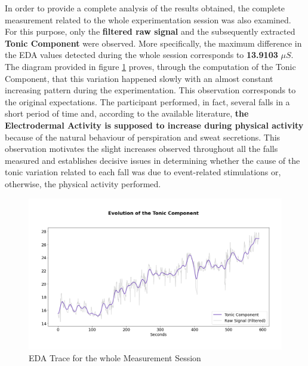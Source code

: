 In order to provide a complete analysis of the results obtained, the complete measurement related to the whole experimentation session was also examined. For this purpose, only the \textbf{filtered raw signal} and the subsequently extracted \textbf{Tonic Component} were observed. More specifically, the maximum difference in the EDA values detected during the whole session corresponds to \textbf{13.9103} $\mu S$. The diagram provided in figure \ref{fig:movisens-global} proves, through the computation of the Tonic Component, that this variation happened slowly with an almost constant increasing pattern during the experimentation. This observation corresponds to the original expectations. The participant performed, in fact, several falls in a short period of time and, according to the available literature, \textbf{the Electrodermal Activity is supposed to increase during physical activity} \cite{eda-interval-4} because of the natural behaviour of perspiration and sweat secretions. This observation motivates the slight increases observed throughout all the falls measured and establishes decisive issues in determining whether the cause of the tonic variation related to each fall was due to event-related stimulations or, otherwise, the physical activity performed.


\begin{figure}[h]
    \centering
    \includegraphics[width=\textwidth]{./images/movisens/Global.png}
    \caption{EDA Trace for the whole Measurement Session}
    \label{fig:movisens-global}
\end{figure}
